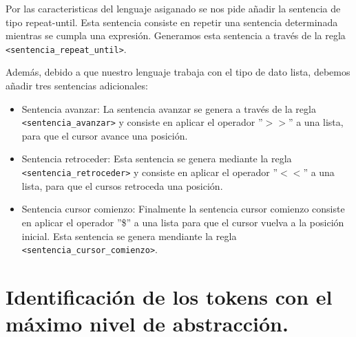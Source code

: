 \documentclass[12pt, spanish]{article}
\begin{document}
Por las caracteristicas del lenguaje asiganado se nos pide añadir la sentencia de tipo repeat-until. Esta sentencia consiste en repetir una sentencia determinada mientras se cumpla una expresión. Generamos esta sentencia a través de la regla \texttt{<sentencia\_repeat\_until>}.

Además, debido a que nuestro lenguaje trabaja con el tipo de dato lista, debemos añadir tres sentencias adicionales:

\begin{itemize}
    \item{Sentencia avanzar}: La sentencia avanzar se genera a través de la regla \texttt{<sentencia\_avanzar>} y consiste en aplicar el operador ''$>>$'' a una lista, para que el cursor avance una posición.
    \item{Sentencia retroceder}: Esta sentencia se genera mediante la regla \texttt{<sentencia\_retroceder>} y consiste en aplicar el operador ''$<<$'' a una lista, para que el cursos retroceda una posición.
    \item{Sentencia cursor comienzo}: Finalmente la sentencia cursor comienzo consiste en aplicar el operador ''\$'' a una lista para que el cursor vuelva a la posición inicial. Esta sentencia se genera mendiante la regla \texttt{<sentencia_cursor_comienzo>}.
\end{itemize}

\section{Identificación de los tokens con el máximo nivel de abstracción.}
\end{document}
